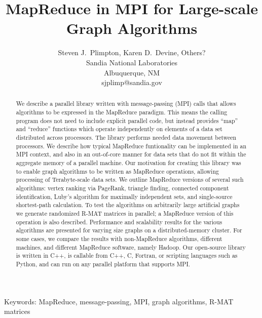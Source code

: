 \documentclass[11pt]{article}
\begin{document}
\title{Map{R}educe in {MPI} for Large-scale Graph Algorithms}

\author{
Steven J.~Plimpton, Karen D.~Devine, Others? \\
Sandia National Laboratories \\
Albuquerque, NM \\
sjplimp@sandia.gov
}

\date{}

\maketitle

\centerline{Keywords: MapReduce, message-passing, MPI, graph
algorithms, R-MAT matrices}

\vspace*{0.4in}

\begin{abstract}

We describe a parallel library written with message-passing (MPI)
calls that allows algorithms to be expressed in the MapReduce
paradigm.  This means the calling program does not need to include
explicit parallel code, but instead provides ``map'' and ``reduce''
functions which operate independently on elements of a data set
distributed across processors.  The library performs needed data
movement between processors.  We describe how typical MapReduce
funtionality can be implemented in an MPI context, and also in an
out-of-core manner for data sets that do not fit within the aggregate
memory of a parallel machine.  Our motivation for creating this
library was to enable graph algorithms to be written as MapReduce
operations, allowing processing of Terabyte-scale data sets.  We
outline MapReduce versions of several such algorithms: vertex ranking
via PageRank, triangle finding, connected component identification,
Luby's algorithm for maximally independent sets, and single-source
shortest-path calculation.  To test the algorithms on arbitrarily
large artificial graphs we generate randomized R-MAT matrices in
parallel; a MapReduce version of this operation is also described.
Performance and scalability results for the various algorithms are
presented for varying size graphs on a distributed-memory cluster.
For some cases, we compare the results with non-MapReduce algorithms,
different machines, and different MapReduce software, namely Hadoop.
Our open-source library is written in C++, is callable from C++, C,
Fortran, or scripting languages such as Python, and can run on any
parallel platform that supports MPI.

\end{abstract}

\pagebreak











\end{document}
